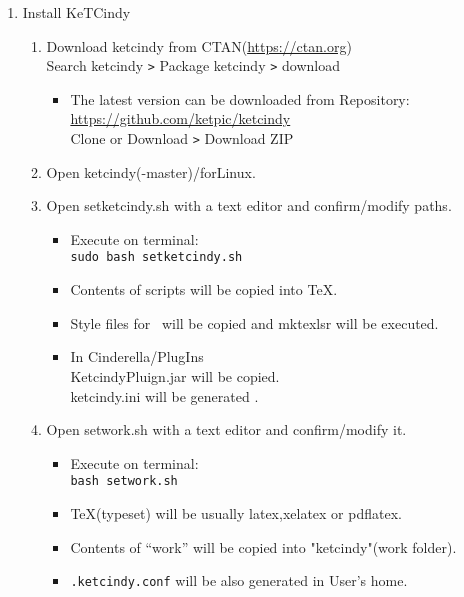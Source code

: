\documentclass{article}
\begin{document}
\begin{enumerate}[\bf\large 1.]
\item Install KeTCindy
  \begin{enumerate}[(1)]
  \item Download ketcindy from CTAN(\url{https://ctan.org})\\
  \hspace*{10mm}Search ketcindy \verb|>| Pack­age ketcindy \verb|>| download
    \begin{itemize}
    \item The latest version can be downloaded from Repository:\\
        \hspace*{5mm}\url{https://github.com/ket­pic/ketcindy}\\
        \hspace*{10mm}Clone or Download \verb|>| Download ZIP
    \end{itemize}
  \item Open ketcindy(-master)/forLinux.
  \item Open setketcindy.sh with a text editor and confirm/modify paths.
    \begin{itemize}
    \item Execute on terminal:\\
    \hspace*{10mm}\verb|sudo bash setketcindy.sh|
    \item Contents of scripts will be copied into TeX.
    \item Style files for \ketcindy\ will be copied and mktexlsr will be executed.
    \item In Cinderella/PlugIns\\
    \hspace*{5mm}KetcindyPluign.jar will be copied.\\
    \hspace*{5mm}ketcindy.ini will be generated .
    \end{itemize}
  \item Open setwork.sh with a text editor and confirm/modify it.
    \begin{itemize}
    \item Execute on terminal:\\
    \hspace*{10mm}\verb|bash setwork.sh|
    \item TeX(typeset) will be usually latex,xelatex or pdflatex.
    \item Contents of “work” will be copied into "ketcindy"(work folder).
    \item \verb|.ketcindy.conf| will be also generated in User's home.\\

\end{itemize}
\end{enumerate}
\end{enumerate}
\end{document}
